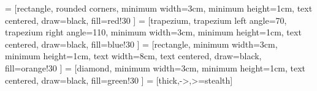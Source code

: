 
\newcommand{\startDocument}{
  \fancyhf{}
  \defaultHeaderRight
  \printPreamble
  \printAbstractGerman
  \printAbstractEnglish  
  \printBlockingNote
  \printTableOfContents
  \printListOfFigures
  \printListOfTables
  \printListOfCode
  \printListOfNomenclature
  \printListOfAcronyms
  \newpage
  \rfoot{\thepage}
}

\newcommand{\finishDocument}{
  \printBibliography
  \printGlossaryCustom
  \printAppendix
  \printDeclarationOfHonor
  \printTodos
}



\newcommand{\diff}{\mathrm{d}}
\newcommand{\diffop}[1]{\frac{\diff}{\diff #1}}
\newcommand{\deriv}[2]{\frac{\diff #1}{\diff #2}}
\newcommand{\nderiv}[3]{\frac{\diff^{#3} #1}{\diff #2^{#3}}}

\usetikzlibrary{shapes, arrows, positioning, bending, calc, chains, intersections}
 = [rectangle,
                         rounded corners,
                         minimum width=3cm,
                         minimum height=1cm,
                         text centered,
                         draw=black,
                         fill=red!30
                        ]
 = [trapezium,
                  trapezium left angle=70,
                  trapezium right angle=110,
                  minimum width=3cm,
                  minimum height=1cm,
                  text centered,
                  draw=black,
                  fill=blue!30
                ]
 = [rectangle,
                       minimum width=3cm,
                       minimum height=1cm,
                       text width=8cm,
                       text centered,
                       draw=black,
                       fill=orange!30
                      ]
 = [diamond,
                        minimum width=3cm,
                        minimum height=1cm,
                        text centered,
                        draw=black,
                        fill=green!30
                      ]
 = [thick,->,>=stealth]        

\pgfplotsset{compat=1.18}